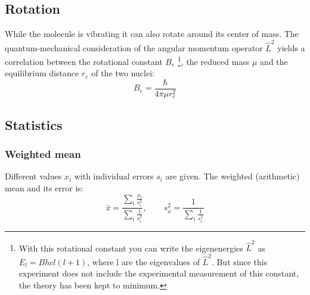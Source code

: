\subsection{Rotation}
While the molecule is vibrating it can also rotate around its center of mass. The quantum-mechanical consideration of the angular momentum 
operator $\hat{L}^2$ yields a correlation between the rotational constant $B_e$
\footnote{With this rotational constant you can write the eigenenergies $\hat{L}^2$ as $E_l = B h c l (l+1)$, where l are the eigenvalues of $\hat{L}^2$. 
But since this experiment does not include the experimental measurement of this constant, the theory has been kept to minimum.}, 
the reduced mass $\mu$ and the equilibrium distance $r_e$ of the two nuclei:
\begin{equation}
  \label{eq:rotconst}
  B_e = \frac{\hbar}{4 \pi \mu r_e^2}
\end{equation}

\subsection{Statistics}
\label{sub:statistics}
\subsubsection{Weighted mean}
Different values $x_i$ with individual errors $s_i$ are given. The weighted (arithmetic) mean and its error is:
\begin{equation}
\label{eq:meanw}
  \bar{x} = \frac{\sum_i \frac{x_i}{s_i^2}}{\sum_i \frac{1}{s_i^2}}, \qquad s_{\bar{x}}^2 = \frac{1}{\sum_i \frac{1}{s_i^2}}
\end{equation}